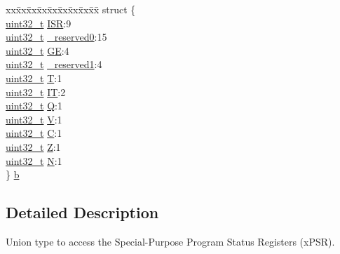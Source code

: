 \begin{DoxyCompactItemize}
\begin{tabbing}
\end{tabbing}\item 
\begin{tabbing}
xx\=xx\=xx\=xx\=xx\=xx\=xx\=xx\=xx\=\kill
struct \{\\
\>\hyperlink{stdint_8h_a435d1572bf3f880d55459d9805097f62}{uint32\_t} \hyperlink{unionx_p_s_r___type_a3e9120dcf1a829fc8d2302b4d0673970}{ISR}:9\\
\>\hyperlink{stdint_8h_a435d1572bf3f880d55459d9805097f62}{uint32\_t} \hyperlink{unionx_p_s_r___type_af438e0f407357e914a70b5bd4d6a97c5}{\_reserved0}:15\\
\>\hyperlink{stdint_8h_a435d1572bf3f880d55459d9805097f62}{uint32\_t} \hyperlink{unionx_p_s_r___type_a2d0ec4ccae337c1df5658f8cf4632e76}{GE}:4\\
\>\hyperlink{stdint_8h_a435d1572bf3f880d55459d9805097f62}{uint32\_t} \hyperlink{unionx_p_s_r___type_a790056bb6f20ea16cecc784b0dd19ad6}{\_reserved1}:4\\
\>\hyperlink{stdint_8h_a435d1572bf3f880d55459d9805097f62}{uint32\_t} \hyperlink{unionx_p_s_r___type_a7eed9fe24ae8d354cd76ae1c1110a658}{T}:1\\
\>\hyperlink{stdint_8h_a435d1572bf3f880d55459d9805097f62}{uint32\_t} \hyperlink{unionx_p_s_r___type_a3200966922a194d84425e2807a7f1328}{IT}:2\\
\>\hyperlink{stdint_8h_a435d1572bf3f880d55459d9805097f62}{uint32\_t} \hyperlink{unionx_p_s_r___type_add7cbd2b0abd8954d62cd7831796ac7c}{Q}:1\\
\>\hyperlink{stdint_8h_a435d1572bf3f880d55459d9805097f62}{uint32\_t} \hyperlink{unionx_p_s_r___type_af14df16ea0690070c45b95f2116b7a0a}{V}:1\\
\>\hyperlink{stdint_8h_a435d1572bf3f880d55459d9805097f62}{uint32\_t} \hyperlink{unionx_p_s_r___type_a40213a6b5620410cac83b0d89564609d}{C}:1\\
\>\hyperlink{stdint_8h_a435d1572bf3f880d55459d9805097f62}{uint32\_t} \hyperlink{unionx_p_s_r___type_a1e5d9801013d5146f2e02d9b7b3da562}{Z}:1\\
\>\hyperlink{stdint_8h_a435d1572bf3f880d55459d9805097f62}{uint32\_t} \hyperlink{unionx_p_s_r___type_a2db9a52f6d42809627d1a7a607c5dbc5}{N}:1\\
\} \hyperlink{unionx_p_s_r___type_a977d6698be0d727360ed8f94bfadf2dc}{b}\\

\end{tabbing}\end{DoxyCompactItemize}


\subsection{Detailed Description}
Union type to access the Special-\/\-Purpose Program Status Registers (x\-P\-S\-R). 

